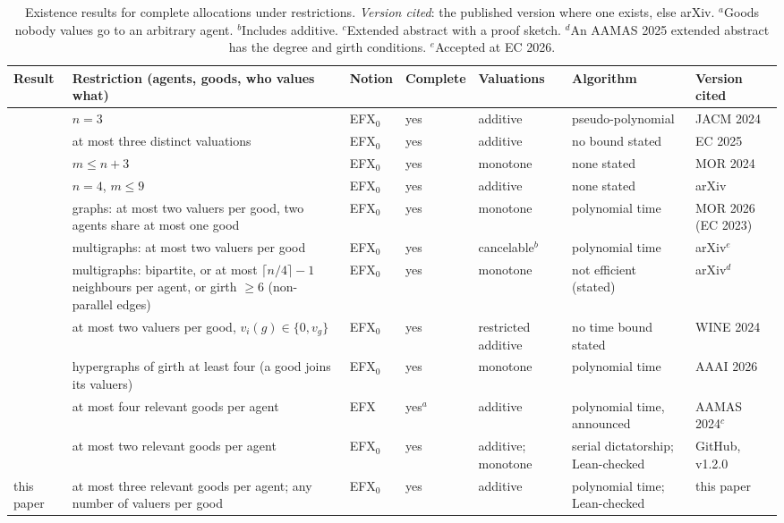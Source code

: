 \documentclass[runningheads,11pt]{llncs}
\newcommand{\efxz}{\texorpdfstring{\mbox{EFX$_0$}}{EFX0}}
\begin{document}
\begin{table}[htbp]
\caption{Existence results for complete allocations under restrictions. \emph{Version cited}: the published version where one exists, else arXiv. $^a$Goods nobody values go to an arbitrary agent. $^b$Includes additive. $^c$Extended abstract with a proof sketch. $^d$An AAMAS 2025 extended abstract has the degree and girth conditions. $^e$Accepted at EC 2026.}\label{tab:rw}
\centering\footnotesize
\setlength{\tabcolsep}{3pt}\begin{tabular}{@{}>{\raggedright\arraybackslash}p{}>{\raggedright\arraybackslash}p{}>{\raggedright\arraybackslash}p{}>{\raggedright\arraybackslash}p{}>{\raggedright\arraybackslash}p{}>{\raggedright\arraybackslash}p{}>{\raggedright\arraybackslash}p{}@{}}
\toprule
Result & Restriction (agents, goods, who values what) & Notion & Complete & Valuations & Algorithm & Version cited \\
\midrule
\cite{ChaudhuryGM20} & $n=3$ & \efxz{} & yes & additive & pseudo-polynomial & JACM 2024 \\
\cite{HVGNV25} & at most three distinct valuations & \efxz{} & yes & additive & no bound stated & EC 2025 \\
\cite{Mahara21} & $m\le n+3$ & \efxz{} & yes & monotone & none stated & MOR 2024 \\
\cite{AlkassarFM26} & $n=4$, $m\le9$ & \efxz{} & yes & additive & none stated & arXiv \\
\cite{ChristodoulouFKS23} & graphs: at most two valuers per good, two agents share at most one good & \efxz{} & yes & monotone & polynomial time & MOR 2026 (EC 2023) \\
\cite{AfshinmehrAMMS26} & multigraphs: at most two valuers per good & \efxz{} & yes & cancelable$^b$ & polynomial time & arXiv$^e$ \\
\cite{SgouritsaS25} & multigraphs: bipartite, or at most $\lceil n/4\rceil-1$ neighbours per agent, or girth $\ge6$ (non-parallel edges) & \efxz{} & yes & monotone & not efficient (stated) & arXiv$^d$ \\
\cite{KavianiSS24} & at most two valuers per good, $v_i(g)\in\{0,v_g\}$ & \efxz{} & yes & restricted additive & no time bound stated & WINE 2024 \\
\cite{LianeasSS26} & hypergraphs of girth at least four (a good joins its valuers) & \efxz{} & yes & monotone & polynomial time & AAAI 2026 \\
\cite{ViswanathanM24} & at most four relevant goods per agent & EFX & yes$^a$ & additive & polynomial time, announced & AAMAS 2024$^c$ \\
\cite{MrdEfx} & at most two relevant goods per agent & \efxz{} & yes & additive; monotone & serial dictatorship; Lean-checked & GitHub, v1.2.0 \\
this paper & at most three relevant goods per agent; any number of valuers per good & \efxz{} & yes & additive & polynomial time; Lean-checked & this paper \\
\bottomrule
\end{tabular}
\end{table}
\end{document}
